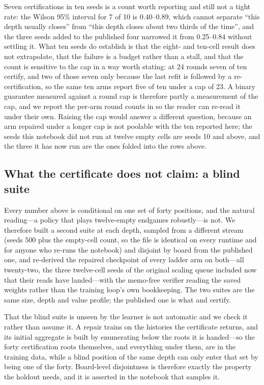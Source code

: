 \documentclass[conference]{IEEEtran}
\begin{document}
Seven certifications in ten seeds is a count worth reporting and still not a tight rate: the Wilson 95\% interval for 7 of 10 is 0.40--0.89, which cannot separate ``this depth usually closes'' from ``this depth closes about two thirds of the time'', and the three seeds added to the published four narrowed it from 0.25--0.84 without settling it. What ten seeds do establish is that the eight- and ten-cell result does not extrapolate, that the failure is a budget rather than a stall, and that the count is sensitive to the cap in a way worth stating: at 24 rounds seven of ten certify, and two of those seven only because the last refit is followed by a re-certification, so the same ten arms report five of ten under a cap of 23. A binary guarantee measured against a round cap is therefore partly a measurement of the cap, and we report the per-arm round counts in  so the reader can re-read it under their own. Raising the cap would answer a different question, because an arm repaired under a longer cap is not poolable with the ten reported here; the seeds this notebook did not run at twelve empty cells are seeds 10 and above, and the three it has now run are the ones folded into the rows above.

\subsection{What the certificate does not claim: a blind suite}
\label{sec:blind}
Every number above is conditional on one set of forty positions, and the natural reading---a policy that plays twelve-empty endgames robustly---is not. We therefore built a second suite at each depth, sampled from a different stream (seeds $500$ plus the empty-cell count, so the file is identical on every runtime and for anyone who re-runs the notebook) and disjoint by board from the published one, and re-derived the repaired checkpoint of every ladder arm on both---all twenty-two, the three twelve-cell seeds of the original scaling queue included now that their reads have landed---with the memo-free verifier reading the saved weights rather than the training loop's own bookkeeping. The two suites are the same size, depth and value profile; the published one is what  and  certify.

That the blind suite is unseen by the learner is not automatic and we check it rather than assume it. A repair trains on the histories the certificate returns, and its initial aggregate is built by enumerating below the roots it is handed---so the forty certification roots themselves, and everything under them, are in the training data, while a blind position of the same depth can only enter that set by being one of the forty. Board-level disjointness is therefore exactly the property the holdout needs, and it is asserted in the notebook that samples it.
\end{document}

